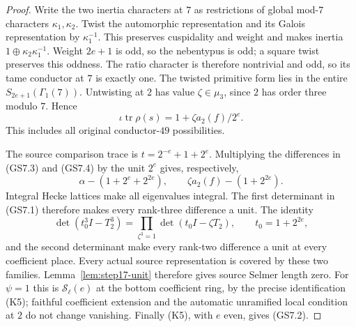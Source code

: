 \begin{proof}
Write the two inertia characters at $7$ as restrictions of global
mod-$7$ characters $\kappa_1,\kappa_2$. Twist the automorphic
representation and its Galois representation by $\kappa_1^{-1}$.
This preserves cuspidality and weight and makes inertia
$1\oplus\kappa_2\kappa_1^{-1}$. Weight $2e+1$ is odd, so the
nebentypus is odd; a square twist preserves this oddness. The
ratio character is therefore nontrivial and odd, so its tame
conductor at $7$ is exactly one. The twisted primitive form lies
in the entire $S_{2e+1}(\Gamma_1(7))$. Untwisting at $2$ has value
$\zeta\in\mu_3$, since $2$ has order three modulo $7$. Hence
\[
        \iota\operatorname{tr}\rho(s)
                     =1+\zeta a_2(f)/2^e.
 \tag{GS7.4}
\]
This includes all original conductor-$49$ possibilities.

The source comparison trace is
$t=2^{-e}+1+2^e$. Multiplying the differences in (GS7.3) and
(GS7.4) by the unit $2^e$ gives, respectively,
\[
       \alpha-(1+2^e+2^{2e}),\qquad
       \zeta a_2(f)-(1+2^{2e}).
\]
Integral Hecke lattices make all eigenvalues integral. The first
determinant in (GS7.1) therefore makes every rank-three difference
a unit. The identity
\[
 \det(t_0^3I-T_2^3)
    =\prod_{\zeta^3=1}\det(t_0I-\zeta T_2),
       \qquad t_0=1+2^{2e},
\]
and the second determinant make every rank-two difference a unit
at every coefficient place. Every actual source representation
is covered by these two families. Lemma~\ref{lem:step17-unit}
therefore gives source Selmer length zero. For $\psi=1$ this is
$\mathcal S_\ell(e)$ at the bottom coefficient ring, by the
precise identification (K5); faithful coefficient extension and
the automatic unramified local condition at $2$ do not change
vanishing. Finally (K5), with $e$ even, gives (GS7.2).
\end{proof}
